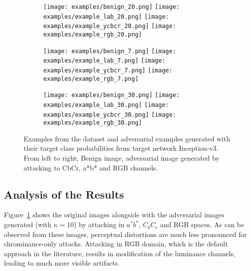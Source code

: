 \begin{figure}[ht]
    \ContinuedFloat
    \begin{subfigure}[b]{\linewidth}
        \caption{}
        \texttt{[image: examples/benign\_20.png]}
        \texttt{[image: examples/example\_lab\_20.png]}
        \texttt{[image: examples/example\_ycbcr\_20.png]}
        \texttt{[image: examples/example\_rgb\_20.png]}
    \end{subfigure}

    \begin{subfigure}[b]{\linewidth}
        \caption{}
        \texttt{[image: examples/benign\_7.png]}
        \texttt{[image: examples/example\_lab\_7.png]}
        \texttt{[image: examples/example\_ycbcr\_7.png]}
        \texttt{[image: examples/example\_rgb\_7.png]}
    \end{subfigure}

    \begin{subfigure}[b]{\linewidth}
        \caption{}
        \texttt{[image: examples/benign\_30.png]}
        \texttt{[image: examples/example\_lab\_30.png]}
        \texttt{[image: examples/example\_ycbcr\_30.png]}
        \texttt{[image: examples/example\_rgb\_30.png]}
    \end{subfigure}


    \caption{Examples from the dataset and adversarial examples generated with their target class probabilities from target network Inception-v3. From left to right; Benign image, adversarial image generated by attacking to CbCr, a*b* and RGB channels. }\label{fig:visualprob}
\end{figure}

\subsection{Analysis of the Results}
Figure~\ref{fig:visualprob} shows the original images alongside with the adversarial images generated (with \(\kappa = 10\)) by attacking in \(a^*b^*\), \(C_{b}C_{r}\) and RGB spaces. As can be observed from these images, perceptual distortions are much less pronounced for chrominance-only attacks. Attacking in RGB domain, which is the default approach in the literature, results in modification of the luminance channels, leading to much more visible artifacts.


